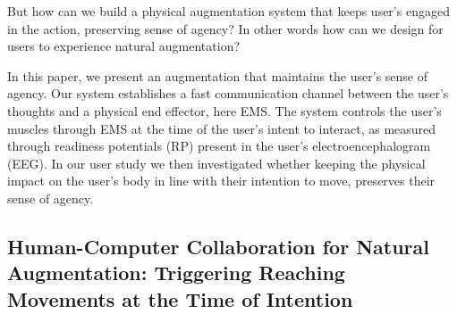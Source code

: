 
But how can we build a physical augmentation system that keeps user's engaged in the action, preserving sense of agency? In other words how can we design for users to experience natural augmentation?


In this paper, we present an augmentation that maintains the user's sense of agency. Our system establishes a fast communication channel between the user's thoughts and a physical end effector, here EMS. The system controls the user's muscles through EMS at the time of the user's intent to interact, as measured through readiness potentials (RP) present in the user's electroencephalogram (EEG). In our user study we then investigated whether keeping the physical impact on the user's body in line with their intention to move, preserves their sense of agency.

\subsection{Human-Computer Collaboration for Natural Augmentation: Triggering Reaching Movements at the Time of Intention}




